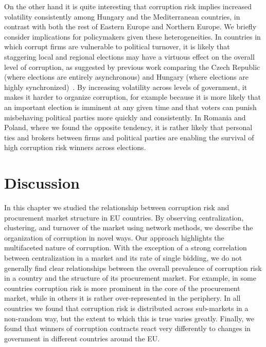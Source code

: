On the other hand it is quite interesting that corruption risk implies increased volatility consistently among Hungary and the Mediterranean countries, in contrast with both the rest of Eastern Europe and Northern Europe. We briefly consider implications for policymakers given these heterogeneities. In countries in which corrupt firms are vulnerable to political turnover, it is likely that staggering local and regional elections may have a virtuous effect on the overall level of corruption, as suggested by previous work comparing the Czech Republic (where elections are entirely asynchronous) and Hungary (where elections are highly synchronized)~\cite{fazekas2017networks}. By increasing volatility across levels of government, it makes it harder to organize corruption, for example because it is more likely that an important election is imminent at any given time and that voters can punish misbehaving political parties more quickly and consistently. In Romania and Poland, where we found the opposite tendency, it is rather likely that personal ties and brokers between firms and political parties are enabling the survival of high corruption risk winners across elections.



\section{Discussion}


In this chapter we studied the relationship between corruption risk and procurement market structure in EU countries. By observing centralization, clustering, and turnover of the market using network methods, we describe the organization of corruption in novel ways. Our approach highlights the multifaceted nature of corruption. With the exception of a strong correlation between centralization in a market and its rate of single bidding, we do not generally find clear relationships between the overall prevalence of corruption risk in a country and the structure of its procurement market.  For example, in some countries corruption risk is more prominent in the core of the procurement market, while in others it is rather over-represented in the periphery. In all countries we found that corruption risk is distributed across sub-markets in a non-random way, but the extent to which this is true varies greatly. Finally, we found that winners of corruption contracts react very differently to changes in government in different countries around the EU. 

